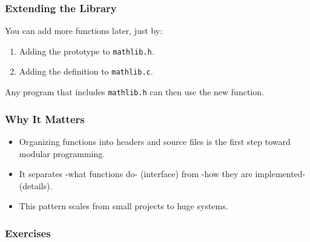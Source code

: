 \documentclass[
  letterpaper,
  DIV=11,
  numbers=noendperiod]{scrreprt}
\providecommand{\tightlist}{%
  \setlength{\itemsep}{0pt}\setlength{\parskip}{0pt}}
\begin{document}
\subsubsection{Extending the Library}\label{extending-the-library}

You can add more functions later, just by:

\begin{enumerate}
\def\labelenumi{\arabic{enumi}.}
\tightlist
\item
  Adding the prototype to \texttt{mathlib.h}.
\item
  Adding the definition to \texttt{mathlib.c}.
\end{enumerate}

Any program that includes \texttt{mathlib.h} can then use the new
function.

\subsubsection{Why It Matters}\label{why-it-matters-23}

\begin{itemize}
\tightlist
\item
  Organizing functions into headers and source files is the first step
  toward modular programming.
\item
  It separates -what functions do- (interface) from -how they are
  implemented- (details).
\item
  This pattern scales from small projects to huge systems.
\end{itemize}

\subsubsection{Exercises}\label{exercises-24}
\end{document}
